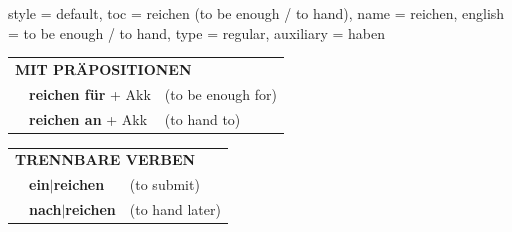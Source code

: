 \begin{verbentry}{
  style = {default},
  toc = {reichen (to be enough / to hand)},
  name = {reichen},
  english = {to be enough / to hand},
  type = {regular},
  auxiliary = {haben}
}
\vspace{10pt}

\begin{tabular}{lll}
\multicolumn{3}{l}{\textbf{MIT PRÄPOSITIONEN}}\\
& \textbf{reichen für} + Akk & (to be enough for)\\
& \textbf{reichen an} + Akk & (to hand to)\\
\end{tabular}
\hfill
\begin{tabular}{lll}
\multicolumn{3}{l}{\textbf{TRENNBARE VERBEN}}\\
& \textbf{ein$|$reichen} & (to submit)\\
& \textbf{nach$|$reichen} & (to hand later)\\
\end{tabular}

\vspace{-5pt}
\end{verbentry}


